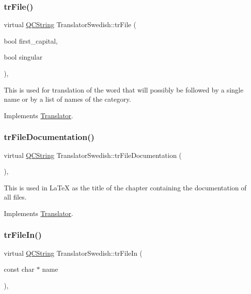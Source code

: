 \subsubsection{\texorpdfstring{trFile()}{trFile()}}
{\footnotesize\ttfamily virtual \mbox{\hyperlink{class_q_c_string}{Q\+C\+String}} Translator\+Swedish\+::tr\+File (\begin{DoxyParamCaption}\item[{bool}]{first\+\_\+capital,  }\item[{bool}]{singular }\end{DoxyParamCaption})\hspace{0.3cm}{\ttfamily [inline]}, {\ttfamily [virtual]}}

This is used for translation of the word that will possibly be followed by a single name or by a list of names of the category. 

Implements \mbox{\hyperlink{class_translator}{Translator}}.

\mbox{\label{class_translator_swedish_aab88946792a50edc7be9659bec1bc310}} 
\subsubsection{\texorpdfstring{trFileDocumentation()}{trFileDocumentation()}}
{\footnotesize\ttfamily virtual \mbox{\hyperlink{class_q_c_string}{Q\+C\+String}} Translator\+Swedish\+::tr\+File\+Documentation (\begin{DoxyParamCaption}{ }\end{DoxyParamCaption})\hspace{0.3cm}{\ttfamily [inline]}, {\ttfamily [virtual]}}

This is used in La\+TeX as the title of the chapter containing the documentation of all files. 

Implements \mbox{\hyperlink{class_translator}{Translator}}.

\mbox{\label{class_translator_swedish_a66bb6c0b8dc70ef92a9b9b042c212328}} 
\subsubsection{\texorpdfstring{trFileIn()}{trFileIn()}}
{\footnotesize\ttfamily virtual \mbox{\hyperlink{class_q_c_string}{Q\+C\+String}} Translator\+Swedish\+::tr\+File\+In (\begin{DoxyParamCaption}\item[{const char $\ast$}]{name }\end{DoxyParamCaption})\hspace{0.3cm}{\ttfamily [inline]}, {\ttfamily [virtual]}}

